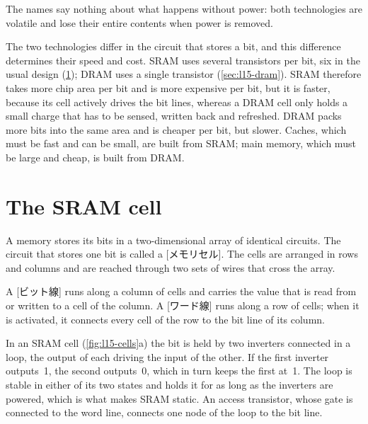 \documentclass[../main.tex]{subfiles}
\begin{document}
The names say nothing about what happens without power: both technologies are
volatile and lose their entire contents when power is removed.

The two technologies differ in the circuit that stores a bit, and this
difference determines their speed and cost.  SRAM uses several transistors per
bit, six in the usual design (\cref{sec:l15-sram}); DRAM uses a single
transistor (\cref{sec:l15-dram}).  SRAM therefore takes more chip area per bit
and is more expensive per bit, but it is faster, because its cell actively
drives the bit lines, whereas a DRAM cell only holds a small charge that has to
be sensed, written back and refreshed.  DRAM packs more bits into the same area
and is cheaper per bit, but slower.  Caches, which must be fast
and can be small, are built from SRAM; main memory, which must be large and
cheap, is built from DRAM.

\section{The SRAM cell}
\label{sec:l15-sram}

A memory stores its bits in a two-dimensional array of identical
circuits.  The circuit that stores one
bit is called a [メモリセル].  The cells are arranged in
rows and columns and are reached through two sets of wires that cross the
array.

\begin{definition}
  A [ビット線] runs along a column of cells and carries the
  value that is read from or written to a cell of the column.  A
  [ワード線] runs along a row of cells; when it is activated,
  it connects every cell of the row to the bit line of its column.
\end{definition}

In an SRAM cell (\cref{fig:l15-cells}a) the bit is held by two inverters
connected in a loop, the output of each driving the input of the other.  If
the first inverter outputs~1, the second outputs~0, which in turn keeps the
first at~1.  The loop is stable in either of its two states and holds it for
as long as the inverters are powered, which is what makes SRAM static.  An
access transistor, whose gate is connected to the word line, connects one node
of the loop to the bit line.
\end{document}
